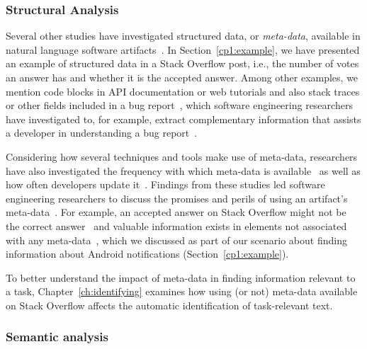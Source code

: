 \subsubsection{Structural Analysis}

Several other studies have 
investigated structured data, or \textit{meta-data}, available in
natural language software artifacts~\cite{Ponzanelli2015}. In Section~\ref{cp1:example},
we have presented an example of structured data in a Stack Overflow post, 
i.e., the number of votes an answer has and whether it is the accepted answer.
Among other examples, we mention 
code blocks in API documentation or web tutorials 
and also stack traces or other fields included in a bug report~\cite{Davies2014, Breu2010},
which software engineering researchers have investigated to, for example, 
extract complementary 
information that assists a developer in understanding a bug report~\cite{bettenburg2008}.


Considering how several techniques and tools make use of meta-data, 
researchers have also
investigated the frequency with which
meta-data is available~\cite{Davies2014, bettenburg2008makes, uddin2015} 
as well as how often developers update it~\cite{ahmad2018, dig2006, shi2011}.
Findings from these studies led 
software engineering researchers to discuss the promises and perils of 
using an artifact's meta-data~\cite{kalliamvakou2014, ahmad2018}.
For example, an accepted answer on Stack Overflow 
might not be the correct answer~\cite{wang2018}
and 
valuable information exists in elements not
associated with any meta-data~\cite{zhang2019so},
which we discussed as part of our 
scenario about finding information about Android notifications (Section~\ref{cp1:example}).


To better understand the impact of meta-data in finding information 
relevant to a task, Chapter~\ref{ch:identifying} 
examines how using (or not) meta-data available on 
Stack Overflow affects the automatic identification 
of task-relevant text.





\subsubsection{Semantic analysis} 

